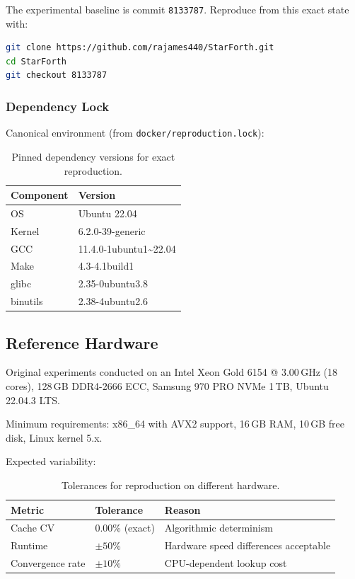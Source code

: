 The experimental baseline is commit \texttt{8133787}. Reproduce from this
exact state with:
\begin{lstlisting}[language=bash]
git clone https://github.com/rajames440/StarForth.git
cd StarForth
git checkout 8133787
\end{lstlisting}

\subsubsection{Dependency Lock}

Canonical environment (from \texttt{docker/reproduction.lock}):

\begin{table}[h]
\centering
\caption{Pinned dependency versions for exact reproduction.}
\begin{tabular}{ll}
\toprule
\textbf{Component} & \textbf{Version} \\
\midrule
OS & Ubuntu 22.04 \\
Kernel & 6.2.0-39-generic \\
GCC & 11.4.0-1ubuntu1\textasciitilde22.04 \\
Make & 4.3-4.1build1 \\
glibc & 2.35-0ubuntu3.8 \\
binutils & 2.38-4ubuntu2.6 \\
\bottomrule
\end{tabular}
\end{table}

\subsection{Reference Hardware}

Original experiments conducted on an Intel Xeon Gold 6154 @ 3.00\,GHz
(18 cores), 128\,GB DDR4-2666 ECC, Samsung 970 PRO NVMe 1\,TB,
Ubuntu 22.04.3 LTS.

Minimum requirements: x86\_64 with AVX2 support, 16\,GB RAM, 10\,GB free
disk, Linux kernel 5.x\raisebox{0.5ex}{+}.

Expected variability:
\begin{table}[h]
\centering
\caption{Tolerances for reproduction on different hardware.}
\begin{tabular}{lll}
\toprule
\textbf{Metric} & \textbf{Tolerance} & \textbf{Reason} \\
\midrule
Cache CV & 0.00\% (exact) & Algorithmic determinism \\
Runtime & $\pm 50\%$ & Hardware speed differences acceptable \\
Convergence rate & $\pm 10\%$ & CPU-dependent lookup cost \\
\bottomrule
\end{tabular}
\end{table}


